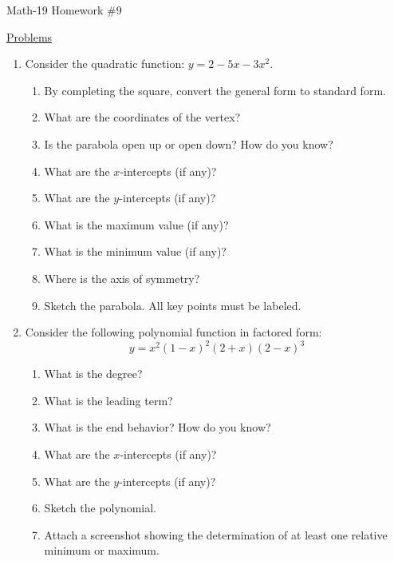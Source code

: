 \documentclass[letterpaper,12pt,fleqn]{article}
\begin{document}
\begin{center}
\Large Math-19 Homework \#9
\end{center}

\vspace{0.5in}

\underline{Problems}

\begin{enumerate}
\item Consider the quadratic function: $y=2-5x-3x^2$.
  \begin{enumerate}
  \item By completing the square, convert the general form to standard form.
  \item What are the coordinates of the vertex?
  \item Is the parabola open up or open down? How do you know?
  \item What are the $x$-intercepts (if any)?
  \item What are the $y$-intercepts (if any)?
  \item What is the maximum value (if any)?
  \item What is the minimum value (if any)?
  \item Where is the axis of symmetry?
  \item Sketch the parabola. All key points must be labeled.
  \end{enumerate}

\item Consider the following polynomial function in factored form:
  \[y=x^2(1-x)^2(2+x)(2-x)^3\]
  \begin{enumerate}
  \item What is the degree?
  \item What is the leading term?
  \item What is the end behavior? How do you know?
  \item What are the $x$-intercepts (if any)?
  \item What are the $y$-intercepts (if any)?
  \item Sketch the polynomial.
  \item Attach a screenshot showing the determination of at least one relative
    minimum or maximum.
  \end{enumerate}
\end{enumerate}
\end{document}
